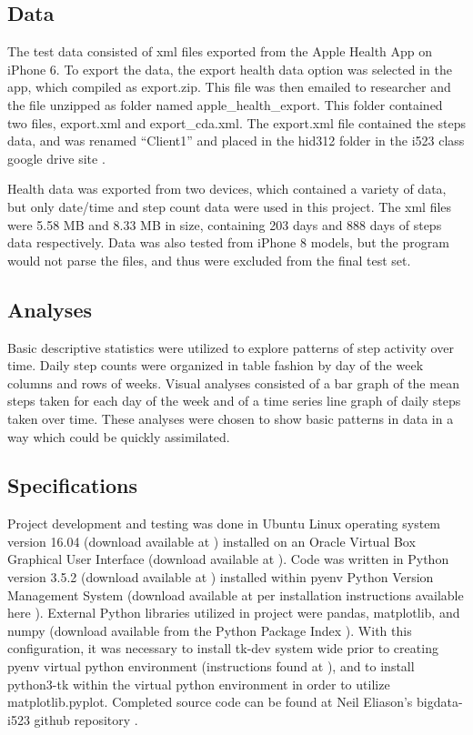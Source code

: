 \documentclass[sigconf]{acmart}
\begin{document}
\subsection{Data}

The test data consisted of xml files exported from the Apple Health App on iPhone 6. To export the data, the export health data option was selected in the app, which compiled as export.zip. This file was then emailed to researcher and the file unzipped as folder named apple\_health\_export. This folder contained two files, export.xml and export\_cda.xml. The export.xml file contained the steps data, and was renamed ``Client1'' and placed in the hid312 folder in the i523 class google drive site \cite{testdata}. 

Health data was exported from two devices, which contained a variety of data, but only date/time and step count data were used in this project. The xml files were 5.58 MB and 8.33 MB in size, containing 203 days and 888 days of steps data respectively. Data was also tested from iPhone 8  models, but the program would not parse the files, and thus were excluded from the final test set.

\subsection{Analyses}

Basic descriptive statistics were utilized to explore patterns of step activity over time. Daily step counts were organized in table fashion by day of the week columns and rows of weeks. Visual analyses consisted of a bar graph of the mean steps taken for each day of the week and of a time series line graph of daily steps taken over time. These analyses were chosen to show basic patterns in data in a way which could be quickly assimilated. 

\subsection{Specifications}

Project development and testing was done in Ubuntu Linux operating system version 16.04 (download available at \cite{ubuntu}) installed on an Oracle Virtual Box Graphical User Interface (download available at \cite{virtualbox}). Code was written in Python version 3.5.2 (download available at \cite{python3.5.2}) installed within pyenv Python Version Management System (download available at \cite{pyenv} per installation instructions available here \cite{cloudmeshpyenv}). External Python libraries utilized in project were pandas, matplotlib, and numpy (download available from the Python Package Index \cite{pypi}). With this configuration, it was necessary to install tk-dev system wide prior to creating pyenv virtual python environment (instructions found at \cite{tk-dev}), and to install python3-tk within the virtual python environment in order to utilize matplotlib.pyplot. Completed source code can be found at Neil Eliason's bigdata-i523 github repository \cite{sourcecode}. 
\end{document}
